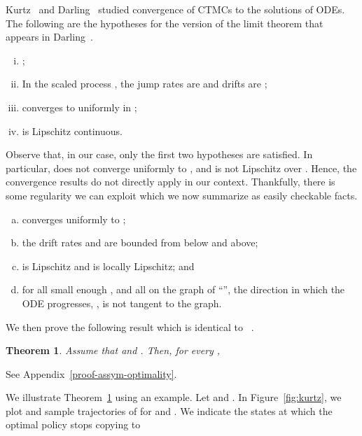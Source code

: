 \documentclass[10pt,journal,letterpaper]{IEEEtran}
\newtheorem{theorem}{Theorem}[section]
\newcommand{\remove}[1]{}
\begin{document}
Kurtz~\cite{stochproc.kurtz70limits-markov-processes} and Darling~\cite{stochproc.darling02fluid-limits}
studied convergence of CTMCs to the solutions of ODEs. The following are the hypotheses for
the version of the limit theorem that appears in Darling~\cite{stochproc.darling02fluid-limits}.
\begin{enumerate}[(i)]
\item ;
\item In the scaled process , the jump rates are  and drifts are ;
\item  converges to  uniformly  in ;
\item  is Lipschitz continuous.
\end{enumerate}
Observe that, in our case, only the first two hypotheses are satisfied.
In particular,  does not converge uniformly to ,
and  is not Lipschitz over . Hence, the convergence results do not directly apply in
our context. Thankfully, there is some regularity we can exploit which
we now summarize as easily checkable facts.
\begin{enumerate}[(a)]
\item  converges uniformly to ;
\item the drift rates  and  are bounded from below and above;
\item  is Lipschitz and  is locally Lipschitz; and
\item for all small enough , and all  on the graph of ``'', the direction in which the ODE
progresses, , is not tangent to the graph.
\end{enumerate}
We then prove the following result which is identical to
~\cite[Theorem~2.8]{stochproc.darling02fluid-limits}.
\begin{theorem}
\label{assym-optimality}
Assume that  and . Then, for every ,

\end{theorem}
\begin{IEEEproof}
See Appendix~\ref{proof-assym-optimality}.
\end{IEEEproof}
\remove{
Moreover, we also obtain the following result.
\begin{theorem}
\label{thm:asym-stop-time}
For every ,

\end{theorem}
\begin{IEEEproof}
\end{IEEEproof}
}
We illustrate Theorem~\ref{assym-optimality} using an example. Let 
and . In Figure~\ref{fig:kurtz}, we plot  and
sample trajectories of  for 
and . We indicate the states at which the optimal policy stops copying to
\end{document}

